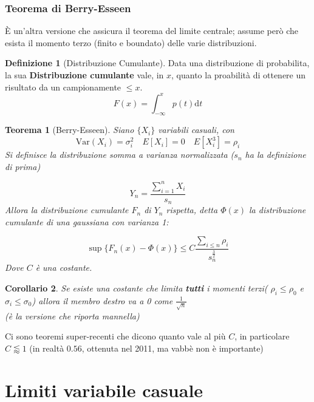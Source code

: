 \documentclass[a4paper,12pt]{article}
\theoremstyle{plain}
\newtheorem{thm}{Teorema}[section]
\newtheorem{cor}[thm]{Corollario}
\theoremstyle{definition}
\newtheorem{defn}{Definizione}[section]
\newcommand{\f}[2]{\frac{#1}{#2}}
\newcommand{\Var}{\mathrm{Var}}
\renewcommand{\d}{\text{d}}
\theoremstyle{remark}
\begin{document}
\subsubsection{Teorema di Berry-Esseen}
È un'altra versione che assicura il teorema del limite centrale; assume però che esista il momento terzo (finito e boundato) delle varie distribuzioni.
\begin{defn}[Distribuzione Cumulante]
Data una distribuzione di probabilita, la sua \textbf{Distribuzione cumulante} vale, in $x$, quanto la proabilità di ottenere un risultato da un campionamente $\le x$.
\[F(x)=\int_{-\infty}^x p(t)\d t\]
\end{defn}
\begin{thm}[Berry-Esseen]
	Siano $\{X_i\}$  variabili casuali, con \[\Var(X_i)=\sigma_i^2\quad E[X_i]=0\quad E[X_i^3]=\rho_i\]
	Si definisce la distribuzione somma a varianza normalizzata ($s_n$ ha la definizione di prima)
	
	\[Y_n=\f{\sum_{i=1}^n X_i}{s_n}\]
	Allora la distribuzione cumulante $F_n$ di $Y_n$ rispetta, detta $\Phi(x)$ la distribuzione cumulante di una gaussiana con varianza 1:
	
	\[\sup\{F_n(x)-\Phi(x)\}\le C\f{\sum_{i\le n}\rho_i}{s_n^{\f{3}{2}}}\]
	Dove $C$ è una costante. \end{thm}
\begin{cor}
Se esiste una costante che limita \textbf{tutti} i momenti terzi( $\rho_i\le \rho_0$ e $\sigma_i\le \sigma_0$) allora il membro destro va a 0 come $\f{1}{\sqrt{n}}$
\\(è la versione che riporta mannella)
\end{cor}
 Ci sono teoremi super-recenti che dicono quanto vale al più $C$, in particolare $C\lessapprox 1$ (in realtà $0.56$, ottenuta nel 2011, ma vabbè non è importante)
\section{Limiti variabile casuale}
\end{document}
